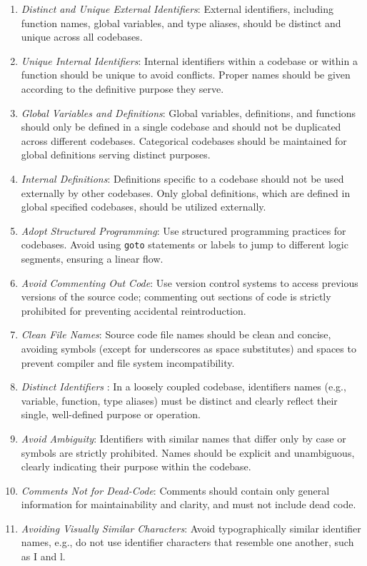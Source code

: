 \documentclass[9pt]{IEEEtran} %
\begin{document}
\begin{enumerate}
  \item \textit{Distinct and Unique External Identifiers}: External identifiers, including function names, global variables, and type aliases, should be distinct and unique across all codebases.
  \item \textit{Unique Internal Identifiers}: Internal identifiers within a codebase or within a function should be unique to avoid conflicts. Proper names should be given according to the definitive purpose they serve.
  \item \textit{Global Variables and Definitions}: Global variables, definitions, and functions should only be defined in a single codebase and should not be duplicated across different codebases. Categorical codebases should be maintained for global definitions serving distinct purposes.
  \item \textit{Internal Definitions}: Definitions specific to a codebase should not be used externally by other codebases. Only global definitions, which are defined in global specified codebases, should be utilized externally.
  \item \textit{Adopt Structured Programming}: Use structured programming practices for codebases. Avoid using \texttt{goto} statements or labels to jump to different logic segments, ensuring a linear flow.
  \item \textit{Avoid Commenting Out Code}: Use version control systems to access previous versions of the source code; commenting out sections of code is strictly prohibited for preventing accidental reintroduction.
  \item \textit{Clean File Names}: Source code file names should be clean and concise, avoiding symbols (except for underscores as space substitutes) and spaces to prevent compiler and file system incompatibility.
  \item \textit{Distinct Identifiers} : In a loosely coupled codebase, identifiers names (e.g., variable, function, type aliases) must be distinct and clearly reflect their single, well-defined purpose or operation.
  \item \textit{Avoid Ambiguity}: Identifiers with similar names that differ only by case or symbols are strictly prohibited. Names should be explicit and unambiguous, clearly indicating their purpose within the codebase.
  \item \textit{Comments Not for Dead-Code}: Comments should contain only general information for maintainability and clarity, and must not include dead code.
  \item \textit{Avoiding Visually Similar Characters}: Avoid typographically similar identifier names, e.g., do not use identifier characters that resemble one another, such as I and l.

\end{enumerate}
\end{document}
